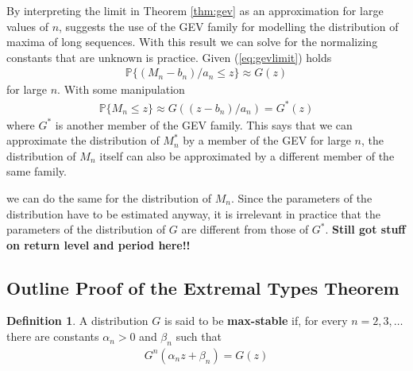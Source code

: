 \documentclass[a4paper,10pt]{article}
\theoremstyle{definition}
\newtheorem{defn}[thm]{Definition}
\numberwithin{equation}{section}
\begin{document}
By interpreting the limit in Theorem \ref{thm:gev} as an approximation for large values of $n$, suggests the use of the GEV family for modelling the distribution of maxima of long sequences. With this result we can solve for the normalizing constants that are unknown is practice. Given (\ref{eq:gevlimit}) holds
\begin{align*}
\mathbb{P}\{(M_n-b_n)/a_n\leq z\} \approx G(z)
\end{align*}
for large $n$. With some manipulation 
\begin{align*}
\mathbb{P}\{M_n\leq z\} \approx G((z-b_n)/a_n) = G^\ast(z)
\end{align*}
where $G^\ast$ is another member of the GEV family. This says that we can approximate the distribution of $M_n^\ast$ by a member of the GEV for large $n$, {\color{red}the distribution of $M_n$ itself can also be approximated by a different member of the same family.}


we can do the same for the distribution of $M_n$. {\color{red} Since the parameters of the distribution have to be estimated anyway, it is irrelevant in practice that the parameters of the distribution of $G$ are different from those of $G^\ast$}. \textbf{Still got stuff on return level and period here!!}

\subsection{Outline Proof of the Extremal Types Theorem}

\begin{defn}
A distribution $G$ is said to be \textbf{max-stable} if, for every $n=2,3,\ldots$ there are constants $\alpha_n>0$ and $\beta_n$ such that
\begin{align*}
G^n(\alpha_nz+\beta_n) = G(z)
\end{align*}
\end{defn}
\end{document}

